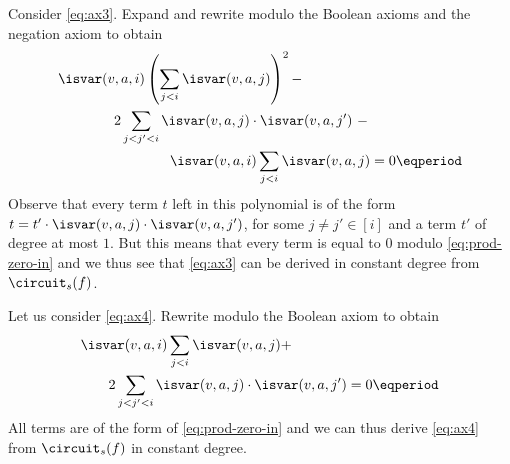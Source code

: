 Consider \cref{eq:ax3}. Expand and rewrite modulo the Boolean axioms
and the negation axiom to obtain
\begin{align}
  &\isvar(v,a,i)
  \left(\sum_{j < i} \isvar(v,a,j)\right)^2-\nonumber\\
  &\qquad\qquad 2\sum_{j < j' < i}\isvar(v,a,j)\cdot\isvar(v,a,j')~-\nonumber\\
  &\qquad\qquad\qquad\qquad\isvar(v,a,i)\sum_{j < i}\isvar(v,a,j)
  = 0 \eqperiod
\end{align}
Observe that every term $t$ left in this polynomial is of the form
$t = t' \cdot \isvar(v,a,j) \cdot \isvar(v,a,j')$, for some
$j \neq j'\in [i]$ and a term $t'$ of degree at most $1$. But this
means that every term is equal to $0$ modulo \cref{eq:prod-zero-in}
and we thus see that \cref{eq:ax3} can be derived in constant degree
from $\circuit_s(f)$.

Let us consider \cref{eq:ax4}. Rewrite modulo the Boolean axiom to
obtain
\begin{align}
  &\isvar(v,a,i)\sum_{j < i}\isvar(v,a,j) +\nonumber\\
  &\qquad 2 \sum_{j < j' < i}\isvar(v,a,j)\cdot \isvar(v,a,j')
  = 0 \eqperiod
\end{align}
All terms are of the form of \cref{eq:prod-zero-in} and we can thus
derive \cref{eq:ax4} from $\circuit_s(f)$ in constant degree.

